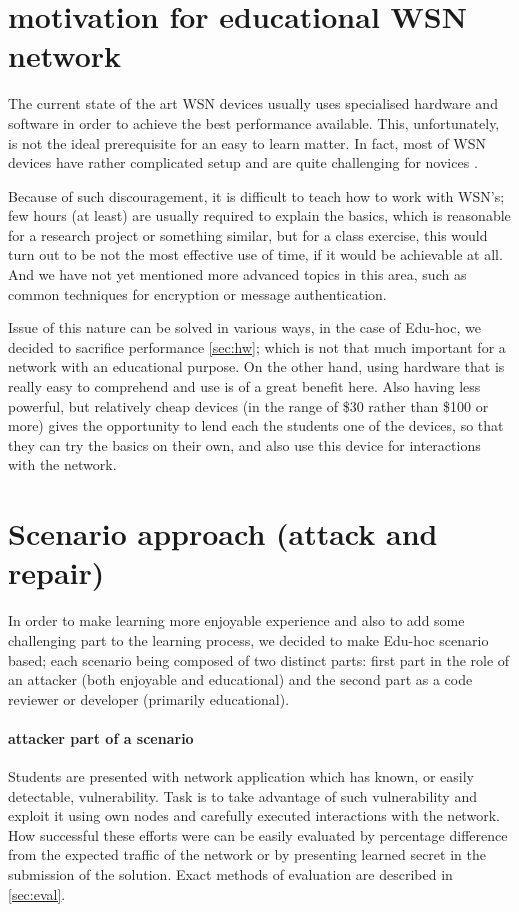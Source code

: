 \documentclass[
  print, %
  table,   %
  nolof,     %
  nolot,     %
           oneside
]{fithesis3}
\begin{document}
  \section{motivation for educational WSN network}
  The current state of the art WSN devices usually uses specialised hardware and software in order to achieve the best performance available. %
  This, unfortunately, is not the ideal prerequisite for an easy to learn matter. In fact, most of WSN devices have rather complicated setup and are quite challenging for novices \cite{hu2010wireless}.

  Because of such discouragement, it is difficult to teach how to
  work with WSN’s; few hours (at least) are usually required
  to explain the basics, which is reasonable for a research project or
  something similar, but for a class exercise, this would turn out to be
  not the most effective use of time, if it would be achievable at all. And
  we have not yet mentioned more advanced topics in this area, such as
  common techniques for encryption or message authentication.

  Issue of this nature can be solved in various ways,
  in the case of Edu-hoc, we decided to sacrifice performance \ref{sec:hw}; which is not that much important for a network with an educational purpose. On the other hand, using hardware that is really easy to comprehend and use is of a great benefit here. Also having less powerful, but relatively cheap devices (in the range of \$30 rather than \$100 or more) gives the opportunity to lend each the students one of the devices, so that they can try the basics on their own, and also use this device for interactions with the network.

  \section{Scenario approach (attack and repair)}
  In order to make learning more enjoyable experience and also to add some challenging part to the learning process, we decided to make Edu-hoc scenario based; each scenario being composed of two distinct parts: first part in the role of an attacker (both enjoyable and educational) and the second part as a code reviewer or developer (primarily educational).

  \paragraph{attacker part of a scenario}\label{par:att}
    Students are presented with network application which has known, or easily detectable, vulnerability. Task is to take advantage of such vulnerability and exploit it using own nodes and carefully executed interactions with the network. How successful these efforts were can be easily evaluated by percentage difference from the expected traffic of the network or by presenting learned secret in the submission of the solution. Exact methods of evaluation are described in \ref{sec:eval}.
\end{document}
